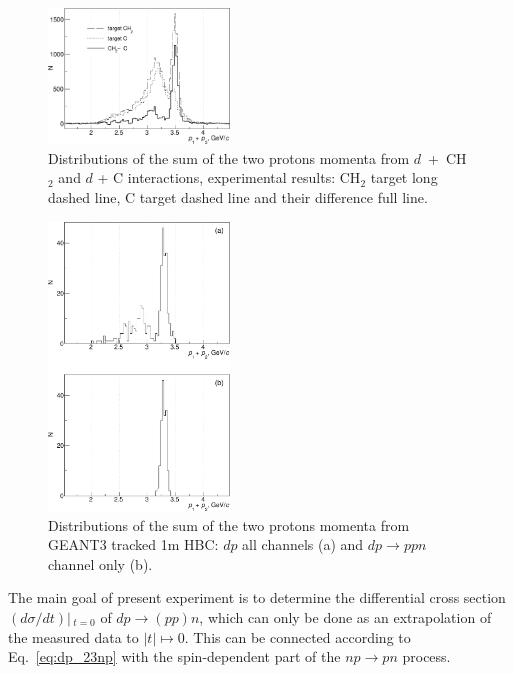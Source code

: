 \documentclass[twocolumn,epjc3]{svjour3}
\newcommand{\np}     {\ensuremath{np \rightarrow pn}\xspace}
\newcommand{\dpfrag} {\ensuremath{dp \rightarrow ppn}\xspace}
\newcommand{\dpchex} {\ensuremath{dp \rightarrow (pp)n}\xspace}
\begin{document}
\begin{figure}[t]
  \centering
  \includegraphics[width=0.43\textwidth]{p1_plus_p2_1.pdf}
  \caption{Distributions of the sum of the two protons momenta from
    $d$~+~CH$_{2}$ and $d$ + C interactions, experimental results: CH$_2$ target
    long dashed line, C target dashed line and their difference full line.}
  \label{fig:p1p2exp}
\end{figure}
\begin{figure}[t]
  \centering
  \includegraphics[width=0.43\textwidth]{p1_plus_p2_2.pdf}
  \caption{Distributions of the sum of the two protons momenta from GEANT3
    tracked 1m HBC: $dp$ all channels (a) and \dpfrag channel only (b).}
  \label{fig:p1p2sim}
\end{figure}

The main goal of present experiment is to determine the differential cross
section $(d\sigma/dt)|\,_{t=0}$ of \dpchex, which can only be done as an
extrapolation of the measured data to $|t|\mapsto0$. This can be connected
according to Eq.~\eqref{eq:dp_23np} with the spin-dependent part of the \np
process.
\end{document}
